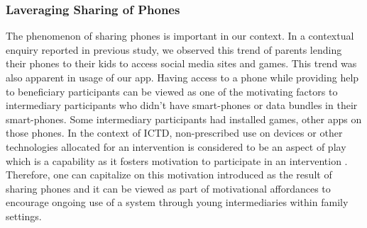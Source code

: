 \documentclass{sig-alternate}
\begin{document}
\subsubsection*{\textbf{Laveraging Sharing of Phones}}
The phenomenon of sharing phones is important in our context. In a contextual enquiry reported in previous study, we observed this trend of parents lending their phones to their kids to access social media sites and games. This trend was also apparent in usage of our app. Having access to a phone while providing help to beneficiary participants can be viewed as one of the motivating factors to intermediary participants who didn't have smart-phones or data bundles in their smart-phones. Some intermediary participants had installed games, other apps on those phones. In the context of ICTD, non-prescribed use on devices or other technologies allocated for an intervention is considered to be an aspect of play which is a capability as it fosters motivation to participate in an intervention \cite{ferr2015:play}. Therefore, one can capitalize on this motivation introduced as the result of sharing phones and it can be viewed as part of motivational affordances to encourage ongoing use of a system through young intermediaries within family settings.
\end{document}
